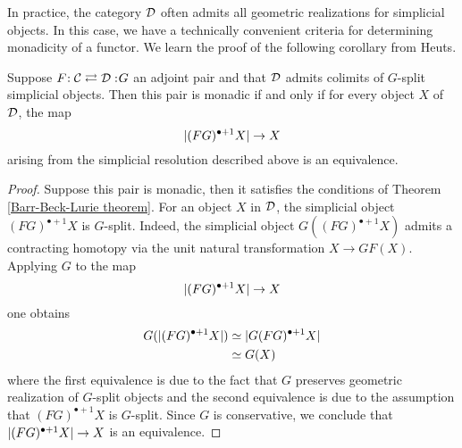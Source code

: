 In practice, the category ${\mathcal{D}}$ often admits all geometric realizations for simplicial objects. In this case, we have a technically convenient criteria for determining monadicity of a functor. We learn the proof of the following corollary from Heuts.
\begin{corollary}
\label{Cor of Barr-Beck-Lurie theorem}
Suppose $F\negmedspace: {\mathcal{C}}\rightleftarrows {\mathcal{D}}:\negmedspace G$ an adjoint pair and that ${\mathcal{D}}$ admits colimits of $G$-split simplicial objects. Then this pair is monadic if and only if for every object $X$ of ${\mathcal{D}}$, the map
$$
\lvert(FG)^{\bullet+1}X\rvert \to X
$$
arising from the simplicial resolution described above is an equivalence.
\end{corollary}
\begin{proof}
	Suppose this pair is monadic, then it satisfies the conditions of Theorem \ref{Barr-Beck-Lurie theorem}. 
	For an object $X$ in ${\mathcal{D}}$, the simplicial object $(FG)^{\bullet+1}X$ is $G$-split. Indeed, the simplicial object $G((FG)^{\bullet+1}X)$ admits a contracting homotopy via the unit natural transformation $X \to GF(X)$.
	Applying $G$ to the map 
	$$
	\lvert(FG)^{\bullet+1}X\rvert \to X
	$$
	one obtains
	\begin{align*}
		G(\lvert(FG)^{\bullet+1}X\rvert) & \simeq \lvert G(FG)^{\bullet+1}X\rvert\\
		& \simeq G(X)
	\end{align*}
	where the first equivalence is due to the fact that $G$ preserves geometric realization of $G$-split objects and the second equivalence is due to the assumption that $(FG)^{\bullet+1}X$ is $G$-split.  
	Since $G$ is conservative, we conclude that $\lvert(FG)^{\bullet+1}X\rvert \to X$ is an equivalence.
	

\end{proof}
